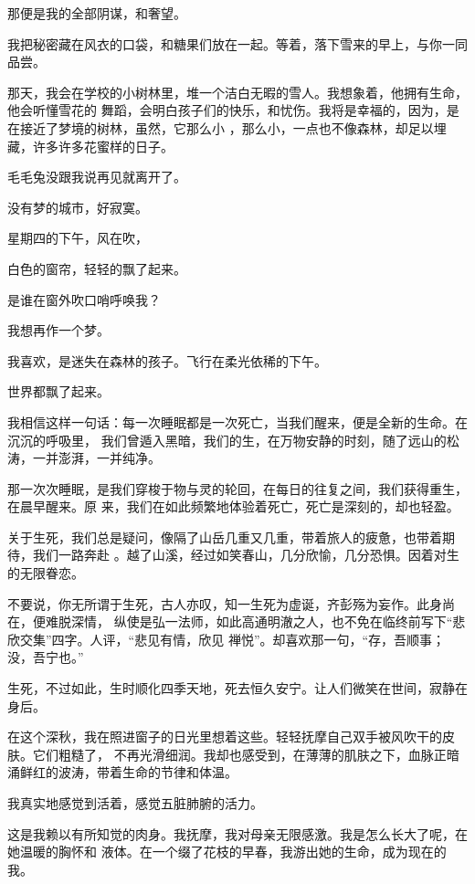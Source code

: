 \documentclass[12pt,a4paper]{article}
\begin{document}
		那便是我的全部阴谋，和奢望。

		我把秘密藏在风衣的口袋，和糖果们放在一起。等着，落下雪来的早上，与你一同品尝。

		那天，我会在学校的小树林里，堆一个洁白无暇的雪人。我想象着，他拥有生命，他会听懂雪花的
	舞蹈，会明白孩子们的快乐，和忧伤。我将是幸福的，因为，是在接近了梦境的树林，虽然，它那么小
	，那么小，一点也不像森林，却足以埋藏，许多许多花蜜样的日子。

		毛毛兔没跟我说再见就离开了。

		没有梦的城市，好寂寞。

		星期四的下午，风在吹，

		白色的窗帘，轻轻的飘了起来。

		是谁在窗外吹口哨呼唤我？

		我想再作一个梦。

		我喜欢，是迷失在森林的孩子。飞行在柔光依稀的下午。

		世界都飘了起来。

	\endwriting



		我相信这样一句话：每一次睡眠都是一次死亡，当我们醒来，便是全新的生命。在沉沉的呼吸里，
	我们曾遁入黑暗，我们的生，在万物安静的时刻，随了远山的松涛，一并澎湃，一并纯净。

		那一次次睡眠，是我们穿梭于物与灵的轮回，在每日的往复之间，我们获得重生，在晨早醒来。原
	来，我们在如此频繁地体验着死亡，死亡是深刻的，却也轻盈。

		关于生死，我们总是疑问，像隔了山岳几重又几重，带着旅人的疲惫，也带着期待，我们一路奔赴
	。越了山溪，经过如笑春山，几分欣愉，几分恐惧。因着对生的无限眷恋。

		不要说，你无所谓于生死，古人亦叹，知一生死为虚诞，齐彭殇为妄作。此身尚在，便难脱深情，
	纵使是弘一法师，如此高通明澈之人，也不免在临终前写下“悲欣交集”四字。人评，“悲见有情，欣见
	禅悦”。却喜欢那一句，“存，吾顺事；没，吾宁也。”

		生死，不过如此，生时顺化四季天地，死去恒久安宁。让人们微笑在世间，寂静在身后。

		在这个深秋，我在照进窗子的日光里想着这些。轻轻抚摩自己双手被风吹干的皮肤。它们粗糙了，
	不再光滑细润。我却也感受到，在薄薄的肌肤之下，血脉正暗涌鲜红的波涛，带着生命的节律和体温。

		我真实地感觉到活着，感觉五脏肺腑的活力。

		这是我赖以有所知觉的肉身。我抚摩，我对母亲无限感激。我是怎么长大了呢，在她温暖的胸怀和
	液体。在一个缀了花枝的早春，我游出她的生命，成为现在的我。
\end{document}
